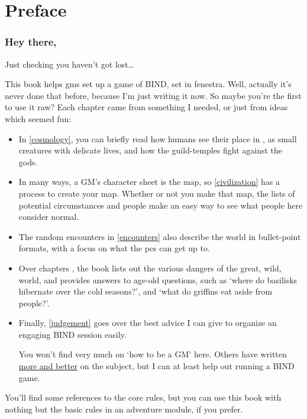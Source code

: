 \chapter{Preface}

\begin{multicols}{2}

\subsection{Hey there,}

Just checking you haven't got lost\ldots

This book helps \glspl{gm} set up a game of BIND, set in \gls{fenestra}.
Well, actually it's never done that before, because I'm just writing it now.
So maybe you're the first to use it raw?
Each chapter came from something I needed, or just from ideas which seemed fun:

\begin{itemize}
  \item
  In \autoref{cosmology}, you can briefly read how humans see their place in , as small creatures with delicate lives, and how the guild-temples fight against the gods.
  \item
  In many ways, a GM's character sheet is the map, so \autoref{civilization} has a process to create your map.
  Whether or not you make that map, the lists of potential circumstances and people make an easy way to see what people here consider normal.
  \item
  The random encounters in \autoref{encounters} also describe the world in bullet-point formats, with a focus on what the \glspl{pc} can get up to.
  \item
  Over chapters , the book lists out the various dangers of the great, wild, world, and provides answers to age-old questions, such as `where do basilisks hibernate over the cold seasons?', and `what do griffins eat aside from people?'.
  \item
  Finally, \autoref{judgement} goes over the best advice I can give to organize an engaging BIND session easily.

  You won't find very much on `how to be a GM' here.
  Others have written \href{https://theangrygm.com}{more and better} on the subject, but I can at least help out running a BIND game.
\end{itemize}

You'll find some references to the core rules, but you can use this book with nothing but the basic rules in an adventure module, if you prefer.


\end{multicols}
